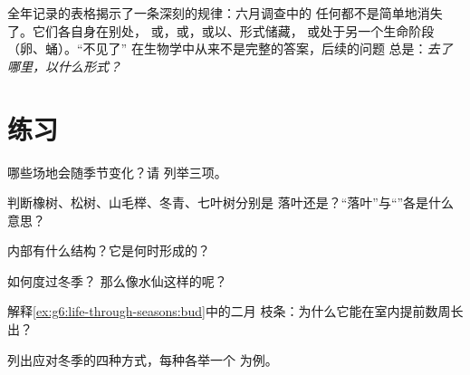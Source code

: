 \begin{remark}[没有什么会凭空消失]\label{rem:g6:life-through-seasons:vanish}
全年记录的表格揭示了一条深刻的规律：六月调查中的
任何都不是简单地消失了。它们各自身在别处，
或，或，或以、形式储藏，
或处于另一个生命阶段（卵、蛹）。“不见了”
在生物学中从来不是完整的答案，后续的问题
总是：\emph{去了哪里，以什么形式？}
\end{remark}

\section{练习}

\begin{exercise}[$\star$]\label{exo:g6:life-through-seasons:1}
哪些场地会随季节变化？请
列举三项。
\end{exercise}

\begin{exercise}[$\star$]\label{exo:g6:life-through-seasons:2}
判断橡树、松树、山毛榉、冬青、七叶树分别是
落叶还是？“落叶”与“”各是什么意思？
\end{exercise}

\begin{exercise}[$\star$]\label{exo:g6:life-through-seasons:3}
内部有什么结构？它是何时形成的？
\end{exercise}

\begin{exercise}[$\star$]\label{exo:g6:life-through-seasons:4}
如何度过冬季？
那么像水仙这样的呢？
\end{exercise}

\begin{exercise}[$\star$]\label{exo:g6:life-through-seasons:5}
解释\cref{ex:g6:life-through-seasons:bud}中的二月
枝条：为什么它能在室内提前数周长出？
\end{exercise}

\begin{exercise}[$\star$]\label{exo:g6:life-through-seasons:6}
列出应对冬季的四种方式，每种各举一个
为例。
\end{exercise}

